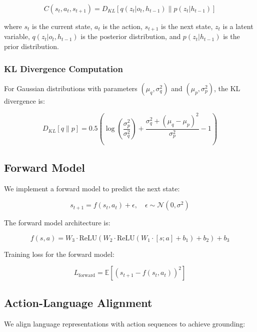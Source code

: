 \documentclass{IEEEtran}
\begin{document}
\begin{equation}
C(s_t, a_t, s_{t+1}) = D_{KL}[q(z_t|o_t, h_{t-1}) \| p(z_t|h_{t-1})]
\end{equation}

where $s_t$ is the current state, $a_t$ is the action, $s_{t+1}$ is the next state, $z_t$ is a latent variable, $q(z_t|o_t, h_{t-1})$ is the posterior distribution, and $p(z_t|h_{t-1})$ is the prior distribution.

\subsubsection{KL Divergence Computation}

For Gaussian distributions with parameters $(\mu_q, \sigma_q^2)$ and $(\mu_p, \sigma_p^2)$, the KL divergence is:

\begin{equation}
D_{KL}[q \| p] = 0.5 \left( \log\left(\frac{\sigma_p^2}{\sigma_q^2}\right) + \frac{\sigma_q^2 + (\mu_q - \mu_p)^2}{\sigma_p^2} - 1 \right)
\end{equation}

\subsection{Forward Model}

We implement a forward model to predict the next state:

\begin{equation}
s_{t+1} = f(s_t, a_t) + \epsilon, \quad \epsilon \sim \mathcal{N}(0, \sigma^2)
\end{equation}

The forward model architecture is:

\begin{equation}
f(s, a) = W_3 \cdot \text{ReLU}(W_2 \cdot \text{ReLU}(W_1 \cdot [s; a] + b_1) + b_2) + b_3
\end{equation}

Training loss for the forward model:

\begin{equation}
L_{\text{forward}} = \mathbb{E}[(s_{t+1} - f(s_t, a_t))^2]
\end{equation}

\subsection{Action-Language Alignment}

We align language representations with action sequences to achieve grounding:
\end{document}
